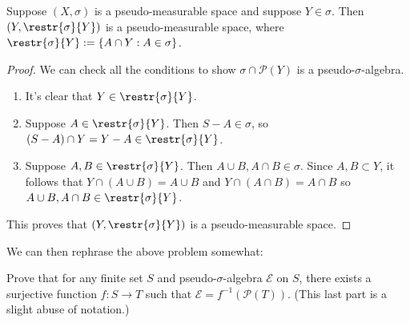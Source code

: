 \documentclass[11pt,letterpaper]{article}
\begin{document}
\begin{lemma}\label{restrlemma}
    Suppose $(X, \sigma)$ is a pseudo-measurable space and suppose $Y\in\sigma$. Then $(Y, \restr{\sigma}{Y})$ is a pseudo-measurable space, where $\restr{\sigma}{Y} := \{ A\cap Y : A\in \sigma\}$.
\end{lemma}
\begin{proof}
    We can check all the conditions to show $\sigma\cap \mathcal{P}(Y)$ is a pseudo-$\sigma$-algebra.
    \begin{enumerate}
        \item It's clear that $Y\in \restr{\sigma}{Y}$.
        \item Suppose $A\in \restr{\sigma}{Y}$. Then $S-A\in \sigma$, so $(S-A)\cap Y = Y-A\in \restr{\sigma}{Y}$.
        \item Suppose $A,B \in \restr{\sigma}{Y}$. Then $A\cup B, A\cap B\in \sigma$. Since $A,B\subset Y$, it follows that $Y\cap (A\cup B) = A\cup B$ and $Y \cap (A\cap B) = A\cap B$ so $A\cup B, A\cap B\in \restr{\sigma}{Y}$.
    \end{enumerate}
    This proves that $\left(Y, \restr{\sigma}{Y}\right)$ is a pseudo-measurable space. 
\end{proof}

We can then rephrase the above problem somewhat:

\begin{lemma}
    Prove that for any finite set $S$ and pseudo-$\sigma$-algebra $\mathcal{E}$ on $S$, there exists a surjective function $f : S \to T$ such that $\mathcal{E}=f^{-1}(\mathcal{P}(T))$. (This last part is a slight abuse of notation.)
\end{lemma}
\end{document}
